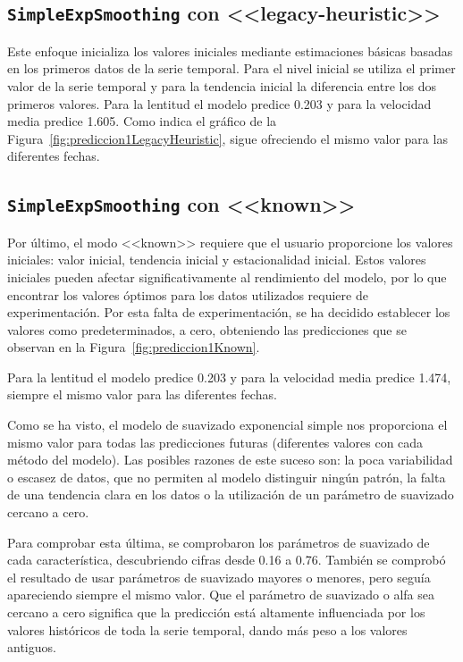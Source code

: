 \subsection{\texttt{SimpleExpSmoothing} con <<legacy-heuristic>>}
Este enfoque inicializa los valores iniciales mediante estimaciones básicas basadas en los primeros datos de la serie temporal. Para el nivel inicial se utiliza el primer valor de la serie temporal y para la tendencia inicial la diferencia entre los dos primeros valores.
Para la lentitud el modelo predice 0.203 y para la velocidad media predice 1.605. Como indica el gráfico de la Figura~\ref{fig:prediccion1LegacyHeuristic}, sigue ofreciendo el mismo valor para las diferentes fechas.


\subsection{\texttt{SimpleExpSmoothing} con <<known>>}
Por último, el modo <<known>> requiere que el usuario proporcione los valores iniciales: valor inicial, tendencia inicial y estacionalidad inicial. Estos valores iniciales pueden afectar significativamente al rendimiento del modelo, por lo que encontrar los valores óptimos para los datos utilizados requiere de experimentación. 
Por esta falta de experimentación, se ha decidido establecer los valores como predeterminados, a cero, obteniendo las predicciones que se observan en la Figura~\ref{fig:prediccion1Known}.

Para la lentitud el modelo predice 0.203 y para la velocidad media predice 1.474, siempre el mismo valor para las diferentes fechas.


Como se ha visto, el modelo de suavizado exponencial simple nos proporciona el mismo valor para todas las predicciones futuras (diferentes valores con cada método del modelo). Las posibles razones de este suceso son: la poca variabilidad o escasez de datos, que no permiten al modelo distinguir ningún patrón, la falta de una tendencia clara en los datos o la utilización de un parámetro de suavizado cercano a cero.

Para comprobar esta última, se comprobaron los parámetros de suavizado de cada característica, descubriendo cifras desde 0.16 a 0.76. 
También se comprobó el resultado de usar parámetros de suavizado mayores o menores, pero seguía apareciendo siempre el mismo valor. Que el parámetro de suavizado o alfa sea cercano a cero significa que la predicción está altamente influenciada por los valores históricos de toda la serie temporal, dando más peso a los valores antiguos.

